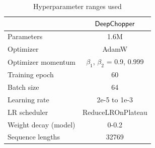 \documentclass[pdflatex,sn-nature, lineno]{sn-jnl}%
\theoremstyle{thmstyleone}%
\theoremstyle{thmstyletwo}%
\theoremstyle{thmstylethree}%
\begin{document}
\renewcommand{\figurename}{Supplementary Fig.}
\renewcommand{\tablename}{Supplementary Table}




\begin{table}
	\centering
	\caption{Hyperparameter ranges used}\label{tab:hyperparameter}
	\begin{tabular}{lc}
		\toprule
		                     & {$\sf DeepChopper$}               \\
		\midrule
		Parameters           & 1.6M                              \\
		Optimizer            & AdamW                             \\
		Optimizer momentum   & $\beta_1$, $\beta_2$ = 0.9, 0.999 \\
		Training epoch       & 60                                \\
		Batch size           & 64                                \\
		Learning rate        & 2e-5 to 1e-3                      \\
		LR scheduler         & ReduceLROnPlateau                 \\
		Weight decay (model) & 0-0.2                             \\
		Sequence lengths     & 32769                             \\
		\midrule
	\end{tabular}
\end{table}


%
\end{document}
